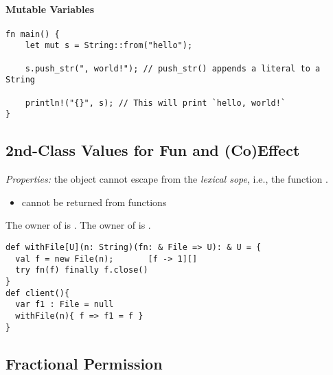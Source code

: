 \paragraph{Mutable Variables}
\begin{lstlisting}[basicstyle=\footnotesize\ttfamily]
fn main() {
    let mut s = String::from("hello");

    s.push_str(", world!"); // push_str() appends a literal to a String

    println!("{}", s); // This will print `hello, world!`
}

\end{lstlisting}
\subsection{2nd-Class Values for Fun and (Co)Effect}
\emph{Properties:} the object  cannot escape from the \emph{lexical sope}, i.e., the function . 
\begin{itemize}
\item {} cannot be returned from functions
\end{itemize}
The owner of  is . The owner of  is . 
\begin{lstlisting}[basicstyle=\footnotesize\ttfamily]
def withFile[U](n: String)(fn: & File => U): & U = {
  val f = new File(n);       [f -> 1][]
  try fn(f) finally f.close()
}
def client(){
  var f1 : File = null
  withFile(n){ f => f1 = f }
}
\end{lstlisting}
\subsection{Fractional Permission}
\cite{permission}


